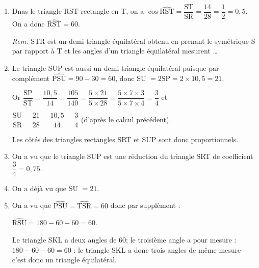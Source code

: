 \begin{enumerate}
\item %
Dnas le triangle RST rectangle en T, on a $\cos \widehat{\text{RST}} = \dfrac{\text{ST}}{\text{SR}} = \dfrac{14}{28} = \dfrac{1}{2} = 0,5$. On a donc $\widehat{\text{RST}} = 60$\degres.

\smallskip

\emph{Rem.} STR est un demi-triangle équilatéral obtenu en prenant le symétrique S par rapport à T et les angles d'un triangle équilatéral mesurent \ldots 
\item %
Le triangle SUP est aussi un demi triangle équilatéral puisque par complément $\widehat{\text{PSU}} = 90 - 30 = 60$\degres, donc SU $ = 2 \text{SP} = 2 \times 10,5 = 21.$

Or $\dfrac{\text{SP}}{\text{ST}} = \dfrac{10,5}{14} = \dfrac{105}{140} = \dfrac{5 \times 21}{5 \times 28} = \dfrac{5 \times 7 \times 3}{5 \times 7 \times 4}
 = \dfrac{3}{4}$ et 
 
$\dfrac{\text{SU}}{\text{SR}} = \dfrac{21}{28} = \dfrac{10,5}{14} 
 = \dfrac{3}{4}$ (d'après le calcul précédent).
 
 Les côtés des triangles rectangles SRT et SUP sont donc proportionnels. 
 \item %
 On a vu que le triangle SUP est une réduction du triangle SRT de coefficient $\dfrac{3}{4} = 0,75$.
\item %
On a déjà vu que SU $ =  21$.
\item %
On a vu que  $\widehat{\text{PSU}} = \widehat{\text{TSR}} = 60$ donc par supplément :

$\widehat{\text{RSU}} = 180 - 60 - 60 = 60$\degres.

Le triangle SKL a deux angles de 60\degres ; le troisième angle a pour mesure : $180 - 60 - 60 = 60$ : le triangle SKL a donc trois angles de même mesure c'est donc un triangle équilatéral.
\end{enumerate}

\vspace{0.5cm}


